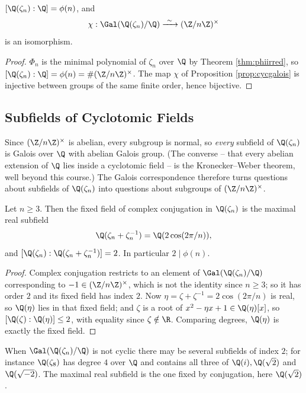 \begin{corollary}\label{cor:cycQ}
	$[\Q(\zeta_n):\Q] = \phi(n)$, and
	$$\chi : \Gal(\Q(\zeta_n)/\Q) \xrightarrow{\ \sim\ } (\Z/n\Z)^\times$$
	is an isomorphism.
\end{corollary}

\begin{proof}
	$\Phi_n$ is the minimal polynomial of $\zeta_n$ over $\Q$ by Theorem \ref{thm:phiirred}, so $[\Q(\zeta_n):\Q] = \phi(n) = \#(\Z/n\Z)^\times$. The map $\chi$ of Proposition \ref{prop:cycgalois} is injective between groups of the same finite order, hence bijective.
\end{proof}

\subsection{Subfields of Cyclotomic Fields}

Since $(\Z/n\Z)^\times$ is abelian, every subgroup is normal, so \emph{every} subfield of $\Q(\zeta_n)$ is Galois over $\Q$ with abelian Galois group. (The converse -- that every abelian extension of $\Q$ lies inside a cyclotomic field -- is the Kronecker--Weber theorem, well beyond this course.) The Galois correspondence therefore turns questions about subfields of $\Q(\zeta_n)$ into questions about subgroups of $(\Z/n\Z)^\times$.

\begin{lemma}\label{lem:realsubfield}
	Let $n \geq 3$. Then the fixed field of complex conjugation in $\Q(\zeta_n)$ is the maximal real subfield
	$$\Q(\zeta_n + \zeta_n^{-1}) = \Q(2\cos(2\pi/n)),$$
	and $[\Q(\zeta_n) : \Q(\zeta_n+\zeta_n^{-1})] = 2$. In particular $2 \mid \phi(n)$.
\end{lemma}

\begin{proof}
	Complex conjugation restricts to an element of $\Gal(\Q(\zeta_n)/\Q)$ corresponding to $-1 \in (\Z/n\Z)^\times$, which is not the identity since $n \geq 3$; so it has order $2$ and its fixed field has index $2$. Now $\eta = \zeta+\zeta^{-1} = 2\cos(2\pi/n)$ is real, so $\Q(\eta)$ lies in that fixed field; and $\zeta$ is a root of $x^2 - \eta x + 1 \in \Q(\eta)[x]$, so $[\Q(\zeta):\Q(\eta)]\leq 2$, with equality since $\zeta\notin\R$. Comparing degrees, $\Q(\eta)$ is exactly the fixed field.
\end{proof}

\begin{remark}
	When $\Gal(\Q(\zeta_n)/\Q)$ is not cyclic there may be several subfields of index $2$; for instance $\Q(\zeta_8)$ has degree $4$ over $\Q$ and contains all three of $\Q(i), \Q(\sqrt2)$ and $\Q(\sqrt{-2})$. The maximal real subfield is the one fixed by conjugation, here $\Q(\sqrt 2)$.
\end{remark}

